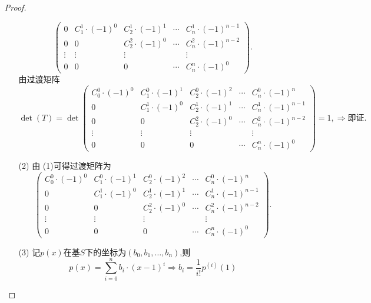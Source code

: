 \documentclass{article}
\begin{document}
\begin{enumerate}
\begin{proof}
\begin{enumerate}
\[\begin{pmatrix}
                    0 & C_{1}^{1}\cdot {(-1)}^{0} & C_{2}^{1}\cdot {(-1)}^{1} &\cdots &  C_{n}^{1}\cdot {(-1)}^{n-1}\\
                    0 & 0 & C_{2}^{2}\cdot {(-1)}^{0} & \cdots & C_{n}^{2}\cdot {(-1)}^{n-2}\\
                    \vdots & \vdots & \vdots & & \vdots\\
                    0 & 0 & 0 & \cdots & C_{n}^{n}\cdot {(-1)}^{0}
                \end{pmatrix}.
            \]
            由过渡矩阵
            \[
                \det(T)=\det\begin{pmatrix}
                    C_{0}^{0}\cdot{(-1)}^{0} & C_{1}^{0}\cdot {(-1)}^{1} & C_{2}^{0}\cdot {(-1)}^{2} & \cdots & C_{n}^{0}\cdot {(-1)}^{n}\\
                    0 & C_{1}^{1}\cdot {(-1)}^{0} & C_{2}^{1}\cdot {(-1)}^{1} &\cdots &  C_{n}^{1}\cdot {(-1)}^{n-1}\\
                    0 & 0 & C_{2}^{2}\cdot {(-1)}^{0} & \cdots & C_{n}^{2}\cdot {(-1)}^{n-2}\\
                    \vdots & \vdots & \vdots & & \vdots\\
                    0 & 0 & 0 & \cdots & C_{n}^{n}\cdot {(-1)}^{0}
                \end{pmatrix}=1,\Rightarrow
                \mbox{即证}.
            \]
            \item [(2)]由 (1)可得过渡矩阵为
            \[
                \begin{pmatrix}
                    C_{0}^{0}\cdot{(-1)}^{0} & C_{1}^{0}\cdot {(-1)}^{1} & C_{2}^{0}\cdot {(-1)}^{2} & \cdots & C_{n}^{0}\cdot {(-1)}^{n}\\
                    0 & C_{1}^{1}\cdot {(-1)}^{0} & C_{2}^{1}\cdot {(-1)}^{1} &\cdots &  C_{n}^{1}\cdot {(-1)}^{n-1}\\
                    0 & 0 & C_{2}^{2}\cdot {(-1)}^{0} & \cdots & C_{n}^{2}\cdot {(-1)}^{n-2}\\
                    \vdots & \vdots & \vdots & & \vdots\\
                    0 & 0 & 0 & \cdots & C_{n}^{n}\cdot {(-1)}^{0}
                \end{pmatrix}.
            \]
            \item [(3)]记$p(x)$在基$S$下的坐标为$(b_0,b_1,\ldots,b_n)$,则
            \[
                p(x)=\sum\limits_{i=0}^n b_i\cdot {(x-1)}^i
                \Rightarrow
                b_i= \displaystyle{\frac{1}{i!}} p^{(i)}(1)
\]
\end{enumerate}
\end{proof}
\end{enumerate}
\end{document}
